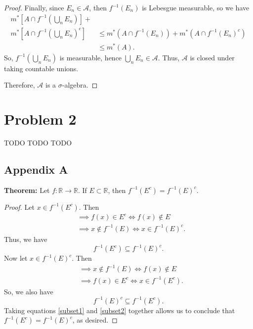 \documentclass{article}
\begin{document}
\begin{proof}
	Finally, since $E_n \in \mathcal{A}$, then $f^{-1}(E_n)$ is Lebesgue measurable, so we have 
	\begin{align}
		m^*\left[A\cap f^{-1}\left(\bigcup_n E_n\right)\right] + \\ m^*\left[A\cap f^{-1}\left(\bigcup_n E_n\right)^c\right]
		&\leq m^*\left(A\cap f^{-1}(E_n)\right) + m^*(A\cap f^{-1}(E_n)^c) \\
		&\leq m^*(A).
	\end{align}
	So, $f^{-1}\left(\bigcup_n E_n\right)$ is measurable, hence $\bigcup_n E_n \in \mathcal{A}$. Thus, $\mathcal{A}$ is closed under taking countable unions.
	
	Therefore, $\mathcal{A}$ is a $\sigma$-algebra.
\end{proof}
\section*{Problem 2}
TODO TODO TODO 

\begin{appendices}
	
\section{Appendix A}
\label{appendix:A}
\textbf{Theorem:} Let $f:\mathbb{R}\rightarrow\mathbb{R}$. If $E \subset \mathbb{R}$, then $f^{-1}(E^c) = f^{-1}(E)^c$.
\begin{proof}
	Let $x \in f^{-1}(E^c)$. Then
	\begin{align}
		&\implies f(x) \in E^c \iff f(x) \notin E \\
		&\implies x \notin f^{-1}(E) \iff x \in f^{-1}(E)^c.
	\end{align}
	Thus, we have
	\begin{equation}\label{subset1}
		f^{-1}(E^c) \subseteq f^{-1}(E)^c.
	\end{equation}
	Now let $x\in f^{-1}(E)^c$. Then
	\begin{align}
		&\implies x \notin f^{-1}(E) \iff f(x) \notin E \\
		&\implies f(x) \in E^c \iff x \in f^{-1}(E^c).
	\end{align}
	So, we also have
	\begin{equation}\label{subset2}
		f^{-1}(E)^c \subseteq f^{-1}(E^c).
	\end{equation}
	Taking equations \eqref{subset1} and \eqref{subset2} together allows us to conclude that \\$f^{-1}(E^c) = f^{-1}(E)^c$, as desired.
\end{proof}
\end{appendices}
	
\end{document}
